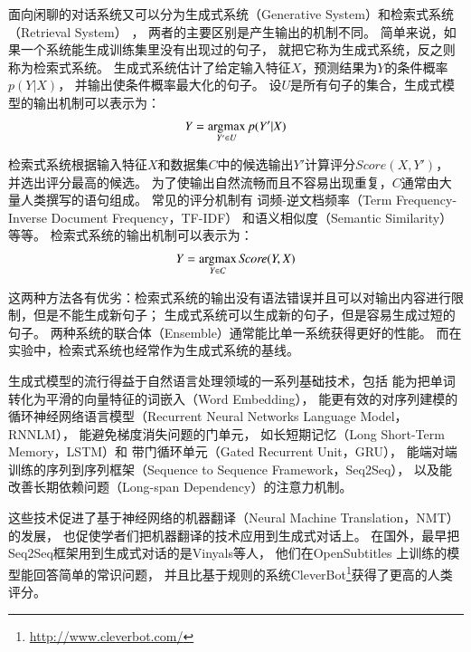 面向闲聊的对话系统又可以分为生成式系统（Generative System）和检索式系统（Retrieval System）
，
两者的主要区别是产生输出的机制不同。
简单来说，如果一个系统能生成训练集里没有出现过的句子，
就把它称为生成式系统，反之则称为检索式系统。
生成式系统估计了给定输入特征$X$，预测结果为$Y$的条件概率$p(Y|X)$，
并输出使条件概率最大化的句子。
设$U$是所有句子的集合，生成式模型的输出机制可以表示为：
\begin{align}
    Y = \operatorname*{argmax}_{Y'\in U} p(Y'|X)
\end{align}

检索式系统根据输入特征$X$和数据集$C$中的候选输出$Y'$计算评分$\textit{Score}(X, Y')$，
并选出评分最高的候选。
为了使输出自然流畅而且不容易出现重复，$C$通常由大量人类撰写的语句组成。
常见的评分机制有
词频-逆文档频率（Term Frequency-Inverse Document Frequency，TF-IDF）
和语义相似度（Semantic Similarity）等等。
检索式系统的输出机制可以表示为：
\begin{align}
    Y = \operatorname*{argmax}_{Y\in C} \textit{Score}(Y, X)
\end{align}

这两种方法各有优劣：检索式系统的输出没有语法错误并且可以对输出内容进行限制，但是不能生成新句子；
生成式系统可以生成新的句子，但是容易生成过短的句子。
两种系统的联合体（Ensemble）通常能比单一系统获得更好的性能。
而在实验中，检索式系统也经常作为生成式系统的基线。

生成式模型的流行得益于自然语言处理领域的一系列基础技术，包括
能为把单词转化为平滑的向量特征的词嵌入（Word Embedding），
能更有效的对序列建模的循环神经网络语言模型（Recurrent Neural Networks Language Model，RNNLM），
能避免梯度消失问题的门单元，
如长短期记忆（Long Short-Term Memory，LSTM）和
带门循环单元（Gated Recurrent Unit，GRU），
能端对端训练的序列到序列框架（Sequence to Sequence Framework，Seq2Seq），
以及能改善长期依赖问题（Long-span Dependency）的注意力机制。

这些技术促进了基于神经网络的机器翻译（Neural Machine Translation，NMT）的发展，
也促使学者们把机器翻译的技术应用到生成式对话上。
在国外，最早把Seq2Seq框架用到生成式对话的是Vinyals等人，
他们在OpenSubtitles
上训练的模型能回答简单的常识问题，
并且比基于规则的系统CleverBot\footnote{\url{http://www.cleverbot.com/}}获得了更高的人类评分。

